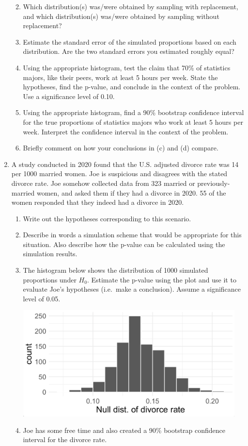 \documentclass[
  letterpaper,
  DIV=11,
  numbers=noendperiod]{scrartcl}
\begin{document}
\begin{enumerate}
  \begin{enumerate}
  \def\labelenumii{\alph{enumii}.}
  \item
    Which distribution(s) was/were obtained by sampling with
    replacement, and which distribution(s) was/were obtained by sampling
    without replacement?
  \item
    Estimate the standard error of the simulated proportions based on
    each distribution. Are the two standard errors you estimated roughly
    equal?
  \item
    Using the appropriate histogram, test the claim that 70\% of
    statistics majors, like their peers, work at least 5 hours per week.
    State the hypotheses, find the p-value, and conclude in the context
    of the problem. Use a significance level of 0.10.
  \item
    Using the appropriate histogram, find a 90\% bootstrap confidence
    interval for the true proportions of statistics majors who work at
    least 5 hours per week. Interpret the confidence interval in the
    context of the problem.
  \item
    Briefly comment on how your conclusions in (c) and (d) compare.
  \end{enumerate}
\item
  A study conducted in 2020 found that the U.S. adjusted divorce rate
  was 14 per 1000 married women. Joe is suspicious and disagrees with
  the stated divorce rate. Joe somehow collected data from 323 married
  or previously-married women, and asked them if they had a divorce in
  2020. 55 of the women responded that they indeed had a divorce in
  2020.

  \begin{enumerate}
  \def\labelenumii{\alph{enumii}.}
  \item
    Write out the hypotheses corresponding to this scenario.
  \item
    Describe in words a simulation scheme that would be appropriate for
    this situation. Also describe how the p-value can be calculated
    using the simulation results.
  \item
    The histogram below shows the distribution of 1000 simulated
    proportions under \(H_{0}\). Estimate the p-value using the plot and
    use it to evaluate Joe's hypotheses (i.e.~make a conclusion). Assume
    a significance level of 0.05.

    \includegraphics[width=4.54167in,height=\textheight]{images/13-divorce.png}
  \item
    Joe has some free time and also created a 90\% bootstrap confidence
    interval for the divorce rate.


\end{enumerate}
\end{enumerate}
\end{document}
